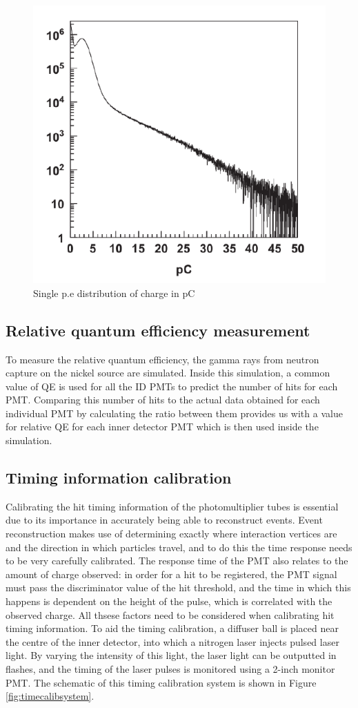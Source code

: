 \begin{figure}
\centering
    \includegraphics[width=.7\textwidth]{Figures/singlepe.png}
\caption{Single p.e distribution of charge in pC \cite{abe_calibration_2014}}
    \label{fig:singlepe}
\end{figure}
    

\subsection{Relative quantum efficiency measurement}

To measure the relative quantum efficiency, the gamma rays from neutron capture on the nickel source are simulated. Inside this simulation, a common value of QE is used for all the ID PMTs to predict the number of hits for each PMT. Comparing this number of hits to the actual data obtained for each individual PMT by calculating the ratio between them provides us with a value for relative QE for each inner detector PMT which is then used inside the simulation. 

\subsection{Timing information calibration}
Calibrating the hit timing information of the photomultiplier tubes is essential due to its importance in accurately being able to reconstruct events. Event reconstruction makes use of determining exactly where interaction vertices are and the direction in which particles travel, and to do this the time response needs to be very carefully calibrated. The response time of the PMT also relates to the amount of charge observed: in order for a hit to be registered, the PMT signal must pass the discriminator value of the hit threshold, and the time in which this happens is dependent on the height of the pulse, which is correlated with the observed charge. All thsese factors need to be considered when calibrating hit timing information.
\newline
To aid the timing calibration, a diffuser ball is placed near the centre of the inner detector, into which a nitrogen laser injects pulsed laser light. By varying the intensity of this light, the laser light can be outputted in flashes, and the timing of the laser pulses is monitored using a 2-inch monitor PMT. The schematic of this timing calibration system is shown in Figure \ref{fig:timecalibsystem}.

